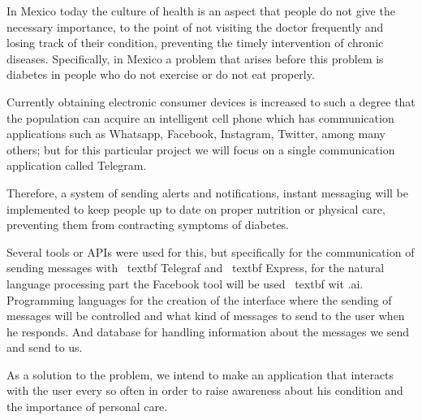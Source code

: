 In Mexico today the culture of health is an aspect that people do not give the necessary importance, to the point of not visiting the doctor frequently and losing track of their condition, preventing the timely intervention of chronic diseases. Specifically, in Mexico a problem that arises before this problem is diabetes in people who do not exercise or do not eat properly.
\vspace {0.50cm}

Currently obtaining electronic consumer devices is increased to such a degree that the population can acquire an intelligent cell phone which has communication applications such as Whatsapp, Facebook, Instagram, Twitter, among many others; but for this particular project we will focus on a single communication application called Telegram.
\vspace {0.50cm}

Therefore, a system of sending alerts and notifications, instant messaging will be implemented to keep people up to date on proper nutrition or physical care, preventing them from contracting symptoms of diabetes.
\vspace {0.50cm}

Several tools or APIs were used for this, but specifically for the communication of sending messages with \ textbf {Telegraf} and \ textbf {Express}, for the natural language processing part the Facebook tool will be used \ textbf {wit .ai}. Programming languages ​​for the creation of the interface where the sending of messages will be controlled and what kind of messages to send to the user when he responds. And database for handling information about the messages we send and send to us.
\vspace {0.50cm}

As a solution to the problem, we intend to make an application that interacts with the user every so often in order to raise awareness about his condition and the importance of personal care.
\vspace{0.50cm}

\\